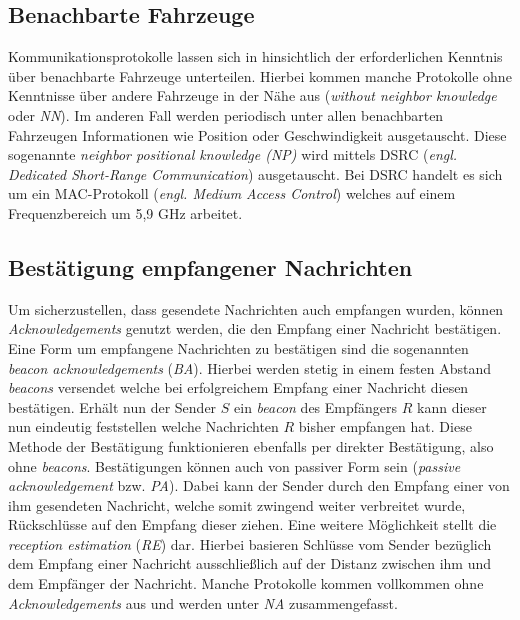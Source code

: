 \documentclass[english,runningheads,a4paper]{llncs}[2018/03/10]
\begin{document}
\subsection{Benachbarte Fahrzeuge}\label{subsec:benachbarte-fahrzeuge}
Kommunikationsprotokolle lassen sich in hinsichtlich der erforderlichen Kenntnis über benachbarte Fahrzeuge unterteilen.
Hierbei kommen manche Protokolle ohne Kenntnisse über andere Fahrzeuge in der Nähe aus (\textit{without neighbor knowledge} oder \textit{NN}).
Im anderen Fall werden periodisch unter allen benachbarten Fahrzeugen Informationen wie Position oder Geschwindigkeit ausgetauscht.
Diese sogenannte \textit{neighbor positional knowledge (NP)} wird mittels DSRC (\textit{engl. Dedicated Short-Range Communication}) ausgetauscht.
Bei DSRC handelt es sich um ein MAC-Protokoll (\textit{engl. Medium Access Control}) welches auf einem Frequenzbereich um 5,9 GHz arbeitet\cite{conti2013mobile}.

\subsection{Bestätigung empfangener Nachrichten}
Um sicherzustellen, dass gesendete Nachrichten auch empfangen wurden, können \textit{Acknowledgements} genutzt werden, die den Empfang einer Nachricht bestätigen.
Eine Form um empfangene Nachrichten zu bestätigen sind die sogenannten \textit{beacon acknowledgements} (\textit{BA}).
Hierbei werden stetig in einem festen Abstand \textit{beacons} versendet welche bei erfolgreichem Empfang einer Nachricht diesen bestätigen.
Erhält nun der Sender $S$ ein \textit{beacon} des Empfängers $R$ kann dieser nun eindeutig feststellen welche Nachrichten $R$ bisher empfangen hat.
Diese Methode der Bestätigung funktionieren ebenfalls per direkter Bestätigung, also ohne \textit{beacons}.
Bestätigungen können auch von passiver Form sein (\textit{passive acknowledgement} bzw. \textit{PA}).
Dabei kann der Sender durch den Empfang einer von ihm gesendeten Nachricht, welche somit zwingend weiter verbreitet wurde, Rückschlüsse auf den Empfang dieser ziehen.
Eine weitere Möglichkeit stellt die \textit{reception estimation} (\textit{RE}) dar.
Hierbei basieren Schlüsse vom Sender bezüglich dem Empfang einer Nachricht ausschließlich auf der Distanz zwischen ihm und dem Empfänger der Nachricht.
Manche Protokolle kommen vollkommen ohne \textit{Acknowledgements} aus und werden unter \textit{NA} zusammengefasst\cite{conti2013mobile}.
\end{document}
